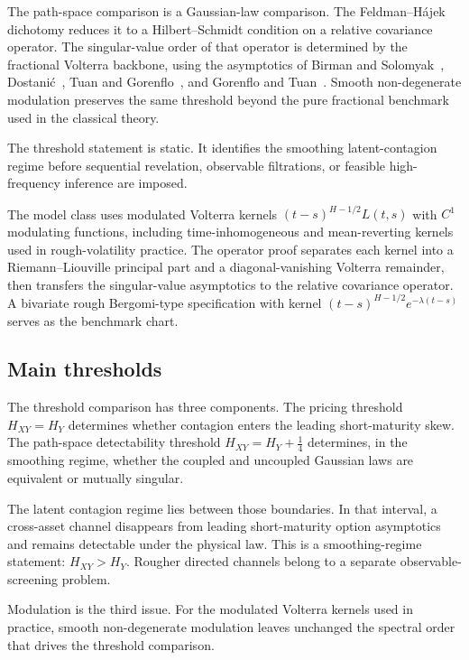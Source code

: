 \documentclass[11pt,a4paper]{amsart}
\theoremstyle{plain}
\theoremstyle{definition}
\theoremstyle{remark}
\begin{document}
The path-space comparison is a Gaussian-law comparison.  The Feldman--H\'ajek dichotomy
\cite{CM44,Fel58,Haj58,Bog98,BN03,Che01,PR08} reduces it to a Hilbert--Schmidt condition on a
relative covariance operator.  The singular-value order of that operator is determined by the
fractional Volterra backbone, using the asymptotics of Birman and Solomyak~\cite{BS77},
Dostani\'c~\cite{Dos93}, Tuan and Gorenflo~\cite{TG94}, and Gorenflo and Tuan~\cite{GT95}.  Smooth
non-degenerate modulation preserves the same threshold beyond the pure fractional benchmark used in
the classical theory.

The threshold statement is static.  It identifies the smoothing latent-contagion regime before
sequential revelation, observable filtrations, or feasible high-frequency inference are imposed.

The model class uses modulated Volterra kernels $(t-s)^{H-1/2}L(t,s)$ with $C^1$ modulating
functions, including time-inhomogeneous and mean-reverting kernels used in rough-volatility
practice.  The operator proof separates each kernel into a Riemann--Liouville principal part and a
diagonal-vanishing Volterra remainder, then transfers the singular-value asymptotics to the
relative covariance operator.  A bivariate rough Bergomi-type specification with kernel
$(t-s)^{H-1/2}e^{-\lambda(t-s)}$ serves as the benchmark chart.

\subsection*{Main thresholds}
The threshold comparison has three components.  The pricing threshold $H_{XY}=H_Y$ determines
whether contagion enters the leading short-maturity skew.  The path-space detectability threshold
$H_{XY}=H_Y+\tfrac14$ determines, in the smoothing regime, whether the coupled and uncoupled
Gaussian laws are equivalent or mutually singular.

The latent contagion regime lies between those boundaries.  In that interval, a cross-asset channel
disappears from leading short-maturity option asymptotics and remains detectable under the physical
law.  This is a smoothing-regime statement: \(H_{XY}>H_Y\).  Rougher directed channels belong to a
separate observable-screening problem.

Modulation is the third issue.  For the modulated Volterra kernels used in practice, smooth
non-degenerate modulation leaves unchanged the spectral order that drives the threshold comparison.
\end{document}

